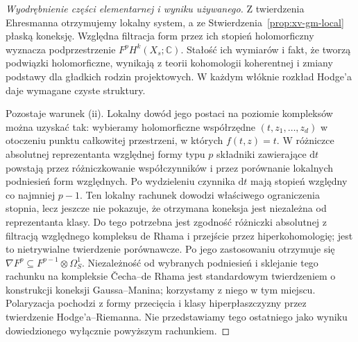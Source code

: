 \documentclass[11pt,a4paper,oneside]{report}
\newcommand{\C}{\mathbb{C}}
\newcommand{\dd}{\mathrm d}
\theoremstyle{plain}
\theoremstyle{definition}
\theoremstyle{remark}
\begin{document}
\begin{proof}[Wyodrębnienie części elementarnej i wyniku używanego]
Z twierdzenia Ehresmanna otrzymujemy lokalny system,
a ze Stwierdzenia~\ref{prop:xv-gm-local} płaską koneksję.
Względna filtracja form przez ich stopień holomorficzny
wyznacza podprzestrzenie $F^pH^k(X_s;\C)$.
Stałość ich wymiarów i fakt, że tworzą podwiązki holomorficzne,
wynikają z teorii kohomologii koherentnej i zmiany podstawy
dla gładkich rodzin projektowych. W każdym włóknie
rozkład Hodge'a daje wymagane czyste struktury.

Pozostaje warunek (ii). Lokalny dowód jego postaci
na poziomie kompleksów można uzyskać tak:
wybieramy holomorficzne współrzędne $(t,z_1,\dots,z_d)$
w otoczeniu punktu całkowitej przestrzeni, w których
$f(t,z)=t$. W różniczce absolutnej reprezentanta
względnej formy typu $p$ składniki zawierające $\dd t$
powstają przez różniczkowanie współczynników i przez
porównanie lokalnych podniesień form względnych.
Po wydzieleniu czynnika $\dd t$ mają stopień
względny co najmniej $p-1$. Ten lokalny rachunek dowodzi
właściwego ograniczenia stopnia, lecz jeszcze nie pokazuje,
że otrzymana koneksja jest niezależna od reprezentanta klasy.
Do tego potrzebna jest zgodność różniczki absolutnej
z filtracją względnego kompleksu de Rhama i przejście
przez hiperkohomologię; jest to nietrywialne twierdzenie
porównawcze. Po jego zastosowaniu otrzymuje się
$\nabla F^p\subseteq F^{p-1}\otimes\Omega_S^1$.
Niezależność od wybranych podniesień i sklejanie
tego rachunku na kompleksie \v{C}echa--de Rhama
jest standardowym twierdzeniem o konstrukcji koneksji
Gaussa--Manina; korzystamy z niego w tym miejscu.
Polaryzacja pochodzi z formy przecięcia i klasy
hiperpłaszczyzny przez twierdzenie Hodge'a--Riemanna.
Nie przedstawiamy tego ostatniego jako wyniku
dowiedzionego wyłącznie powyższym rachunkiem.
\end{proof}
\end{document}
